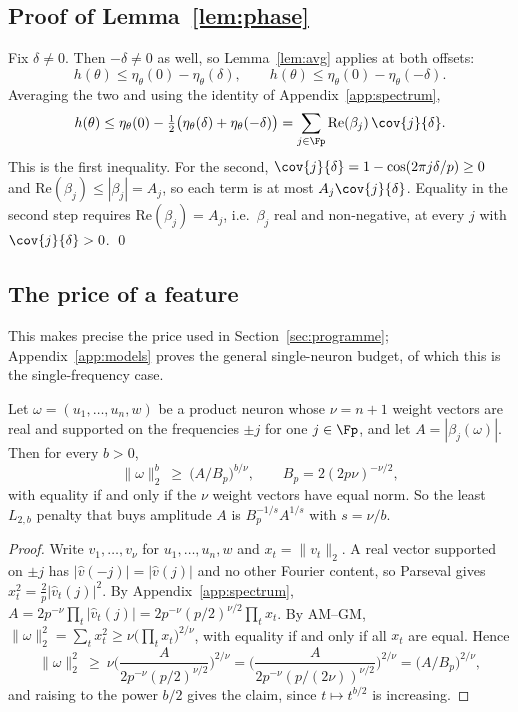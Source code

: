 \subsection{Proof of Lemma~\ref{lem:phase}}\label{app:phase}

Fix $\delta\neq0$. Then $-\delta\neq0$ as well, so Lemma~\ref{lem:avg} applies at both offsets:
\[
h(\theta)\le\eta_\theta(0)-\eta_\theta(\delta),\qquad h(\theta)\le\eta_\theta(0)-\eta_\theta(-\delta).
\]
Averaging the two and using the identity of Appendix~\ref{app:spectrum},
\[
h(\theta)\le\eta_\theta(0)-\tfrac12\big(\eta_\theta(\delta)+\eta_\theta(-\delta)\big)=\sum_{j\in\Fp}\mathrm{Re}(\beta_j)\,\cov{j}{\delta}.
\]
This is the first inequality. For the second, $\cov{j}{\delta}=1-\cos(2\pi j\delta/p)\ge0$ and $\mathrm{Re}(\beta_j)\le|\beta_j|=A_j$, so each term is at most $A_j\cov{j}{\delta}$. Equality in the second step requires $\mathrm{Re}(\beta_j)=A_j$, i.e.\ $\beta_j$ real and non-negative, at every $j$ with $\cov{j}{\delta}>0$.
\qed

\subsection{The price of a feature}\label{app:price}

This makes precise the price used in Section~\ref{sec:programme}; Appendix~\ref{app:models} proves the general single-neuron budget, of which this is the single-frequency case.

\begin{lemma}\label{lem:price}
Let $\omega=(u_1,\dots,u_n,w)$ be a product neuron whose $\nu=n+1$ weight vectors are real and supported on the frequencies $\pm j$ for one $j\in\Fp$, and let $A=|\beta_j(\omega)|$. Then for every $b>0$,
\[
\|\omega\|_2^b\ \ge\ \big(A/B_p\big)^{b/\nu},\qquad B_p=2(2p\nu)^{-\nu/2},
\]
with equality if and only if the $\nu$ weight vectors have equal norm. So the least $L_{2,b}$ penalty that buys amplitude $A$ is $B_p^{-1/s}A^{1/s}$ with $s=\nu/b$.
\end{lemma}
\begin{proof}
Write $v_1,\dots,v_\nu$ for $u_1,\dots,u_n,w$ and $x_t=\|v_t\|_2$. A real vector supported on $\pm j$ has $|\hat v(-j)|=|\hat v(j)|$ and no other Fourier content, so Parseval gives $x_t^2=\frac2p|\hat v_t(j)|^2$. By Appendix~\ref{app:spectrum}, $A=2p^{-\nu}\prod_t|\hat v_t(j)|=2p^{-\nu}(p/2)^{\nu/2}\prod_tx_t$. By AM--GM, $\|\omega\|_2^2=\sum_tx_t^2\ge\nu\big(\prod_tx_t\big)^{2/\nu}$, with equality if and only if all $x_t$ are equal. Hence
\[
\|\omega\|_2^2\ \ge\ \nu\Big(\frac{A}{2p^{-\nu}(p/2)^{\nu/2}}\Big)^{2/\nu}=\Big(\frac{A}{2p^{-\nu}(p/(2\nu))^{\nu/2}}\Big)^{2/\nu}=\big(A/B_p\big)^{2/\nu},
\]
and raising to the power $b/2$ gives the claim, since $t\mapsto t^{b/2}$ is increasing.
\end{proof}

